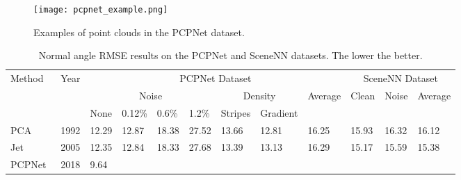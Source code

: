 \documentclass[sigconf]{acmart}
\begin{document}
\begin{figure}[t]
    \centering
    \texttt{[image: pcpnet\_example.png]}
    \caption{Examples of point clouds in the PCPNet dataset. 
}
    \label{fig: pcpnnet example}
\end{figure}

\begin{table*}[t]
    \caption{Normal angle RMSE results on the PCPNet and SceneNN datasets. The lower the better.}
    \small
    \begin{tabular}{@{}l|c|lllllll|lll@{}}
    \toprule
        \multirow{3}{*}{Method} 
        & \multirow{3}{*}{Year} 
        & \multicolumn{7}{c|}{PCPNet Dataset}
        & \multicolumn{3}{c}{SceneNN Dataset}                              
        \\ 
        \cmidrule(l){3-12} 
        &
        & \multicolumn{4}{c|}{Noise }
        & \multicolumn{2}{c|}{Density}            
        & \multicolumn{1}{c|}{\multirow{2}{*}{Average}} 
        & \multicolumn{1}{c}{\multirow{2}{*}{Clean}} 
        & \multicolumn{1}{c|}{\multirow{2}{*}{Noise}} 
        & \multicolumn{1}{c}{\multirow{2}{*}{Average}} 
        \\ 
        \cmidrule(lr){3-8}
        &
        & None 
        & 0.12\% 
        & 0.6\% 
        & \multicolumn{1}{l|}{1.2\%} 
        & Stripes 
        & \multicolumn{1}{l|}{Gradient} 
        & \multicolumn{1}{c|}{}                         
        & \multicolumn{1}{c}{}                       
        & \multicolumn{1}{c|}{}                       
        & \multicolumn{1}{c}{}                         
        \\ 
        \midrule
        PCA~\cite{hoppe1992surface}
        & 1992
        & 12.29      
        & 12.87  
        & 18.38     
        & \multicolumn{1}{l|}{27.52}      
        &  13.66       
        & \multicolumn{1}{l|}{12.81}         
        & 16.25                     
        & 15.93                                     
        & \multicolumn{1}{l|}{16.32}            
        & 16.12    
        \\
        Jet~\cite{cazals2005estimating}
        & 2005
        & 12.35    
        & 12.84       
        & 18.33      
        & \multicolumn{1}{l|}{27.68}      
        & 13.39
        & \multicolumn{1}{l|}{13.13 }         
        & 16.29
        & 15.17
        & \multicolumn{1}{l|}{15.59}               
        & 15.38      
        \\
        PCPNet~\cite{guerrero2018pcpnet}
        & 2018
        & 9.64     

\end{tabular}
\end{table*}
\end{document}
